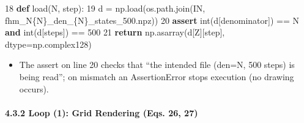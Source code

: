 \documentclass[
  a4paper,
]{ltjsarticle}
\newenvironment{Shaded}{}{}
\newcommand{\BuiltInTok}[1]{\textcolor[rgb]{0.00,0.50,0.00}{#1}}
\newcommand{\ControlFlowTok}[1]{\textcolor[rgb]{0.00,0.44,0.13}{\textbf{#1}}}
\newcommand{\DecValTok}[1]{\textcolor[rgb]{0.25,0.63,0.44}{#1}}
\newcommand{\KeywordTok}[1]{\textcolor[rgb]{0.00,0.44,0.13}{\textbf{#1}}}
\newcommand{\NormalTok}[1]{#1}
\newcommand{\OperatorTok}[1]{\textcolor[rgb]{0.40,0.40,0.40}{#1}}
\newcommand{\SpecialCharTok}[1]{\textcolor[rgb]{0.25,0.44,0.63}{#1}}
\newcommand{\SpecialStringTok}[1]{\textcolor[rgb]{0.73,0.40,0.53}{#1}}
\newcommand{\StringTok}[1]{\textcolor[rgb]{0.25,0.44,0.63}{#1}}
\providecommand{\tightlist}{%
  \setlength{\itemsep}{0pt}\setlength{\parskip}{0pt}}
\begin{document}
\begin{Shaded}
\begin{Highlighting}[]
    \DecValTok{18}  \KeywordTok{def}\NormalTok{ load(N, step):}
    \DecValTok{19}\NormalTok{      d }\OperatorTok{=}\NormalTok{ np.load(os.path.join(IN, }\SpecialStringTok{f\textquotesingle{}hm\_N}\SpecialCharTok{\{}\NormalTok{N}\SpecialCharTok{\}}\SpecialStringTok{\_den\_}\SpecialCharTok{\{}\NormalTok{N}\SpecialCharTok{\}}\SpecialStringTok{\_states\_500.npz\textquotesingle{}}\NormalTok{))}
    \DecValTok{20}      \ControlFlowTok{assert} \BuiltInTok{int}\NormalTok{(d[}\StringTok{\textquotesingle{}denominator\textquotesingle{}}\NormalTok{]) }\OperatorTok{==}\NormalTok{ N }\KeywordTok{and} \BuiltInTok{int}\NormalTok{(d[}\StringTok{\textquotesingle{}steps\textquotesingle{}}\NormalTok{]) }\OperatorTok{==} \DecValTok{500}
    \DecValTok{21}      \ControlFlowTok{return}\NormalTok{ np.asarray(d[}\StringTok{\textquotesingle{}Z\textquotesingle{}}\NormalTok{][step], dtype}\OperatorTok{=}\NormalTok{np.complex128)}
\end{Highlighting}
\end{Shaded}

\begin{itemize}
\tightlist
\item
  The assert on line 20 checks that ``the intended file (den=N, 500
  steps) is being read''; on mismatch an AssertionError stops execution
  (no drawing occurs).
\end{itemize}

\paragraph{4.3.2 Loop (1): Grid Rendering (Eqs. 26,
27)}\label{loop-1-grid-rendering-eqs.-26-27}
\end{document}
